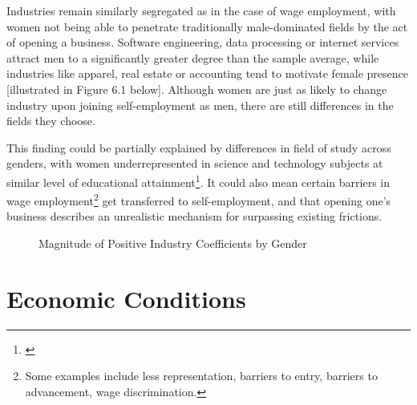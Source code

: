 Industries remain similarly segregated as in the case of wage employment, with women not being able to penetrate traditionally male-dominated fields by the act of opening a business. Software engineering, data processing or internet services attract men to a significantly greater degree than the sample average, while industries like apparel, real estate or accounting tend to motivate female presence [illustrated in Figure 6.1 below]. Although women are just as likely to change industry upon joining self-employment as men, there are still differences in the fields they choose. 

This finding could be partially explained by differences in field of study across genders, with women underrepresented in science and technology subjects at similar level of educational attainment\footnote{\cite{olivetti2016dp11034}}. It could also mean certain barriers in wage employment\footnote{Some examples include less representation, barriers to entry, barriers to advancement, wage discrimination.} get transferred to self-employment, and that opening one's business describes an unrealistic mechanism for surpassing existing frictions. 

\begin{figure}[hbtp]
    \caption{Magnitude of Positive Industry Coefficients by Gender} 
\end{figure}

\section{Economic Conditions}

